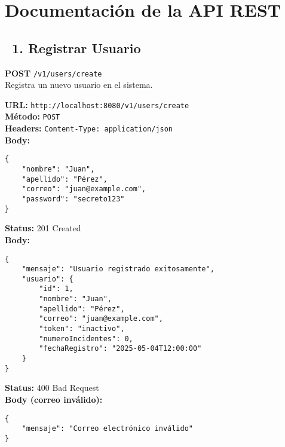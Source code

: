 \section*{Documentación de la API REST}



\subsection*{\faServer\ 1. Registrar Usuario}
\begin{tcolorbox}[endpoint]
    \textbf{POST} \texttt{/v1/users/create}\\
    Registra un nuevo usuario en el sistema.
\end{tcolorbox}

\begin{tcolorbox}[request]
    \textbf{URL:} \textcolor{urlColor}{\texttt{http://localhost:8080/v1/users/create}}\\
    \textbf{Método:} \textcolor{methodColor}{\texttt{POST}}\\
    \textbf{Headers:} \textcolor{headerColor}{\texttt{Content-Type: application/json}}\\
    \textbf{Body:}
    \begin{verbatim}
{
    "nombre": "Juan",
    "apellido": "Pérez",
    "correo": "juan@example.com",
    "password": "secreto123"
}
    \end{verbatim}
\end{tcolorbox}

\begin{tcolorbox}[response]
    \textbf{Status:} 201 Created\\
    \textbf{Body:}
    \begin{verbatim}
{
    "mensaje": "Usuario registrado exitosamente",
    "usuario": {
        "id": 1,
        "nombre": "Juan",
        "apellido": "Pérez",
        "correo": "juan@example.com",
        "token": "inactivo",
        "numeroIncidentes": 0,
        "fechaRegistro": "2025-05-04T12:00:00"
    }
}
    \end{verbatim}
\end{tcolorbox}

\begin{tcolorbox}[response]
    \textbf{Status:} 400 Bad Request\\
    \textbf{Body (correo inválido):}
    \begin{verbatim}
{
    "mensaje": "Correo electrónico inválido"
}
    \end{verbatim}
\end{tcolorbox}

